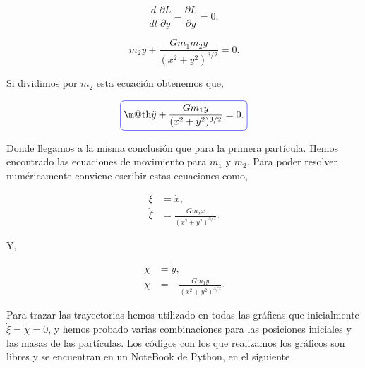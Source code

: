 \documentclass[a4paper,10pt]{article}
\makeatletter
\numberwithin{equation}{section}
\newcommand*{\boxcolor}{blue}
\renewcommand{\boxed}[1]{\textcolor{\boxcolor}{%
\tikz[baseline={([yshift=-1ex]current bounding box.center)}] \node [rectangle, minimum width=1ex,rounded corners,draw] {\normalcolor\m@th$\displaystyle#1$};}}
\makeatother
\begin{document}
\begin{equation}
 \frac{d}{dt} \frac{\partial L}{\partial \dot{y}} - \frac{\partial L}{\partial y} = 0,
\end{equation}

\begin{equation}
 m_2\ddot{y} + \frac{G m_1 m_2 y}{(x^2+y^2)^{3/2}} = 0.
\end{equation}

Si dividimos por $m_2$ esta ecuación obtenemos que,

\begin{equation}
 \boxed{\ddot{y} + \frac{G m_1 y}{(x^2+y^2)^{3/2}} = 0.}
\end{equation}

Donde llegamos a la misma conclusión que para la primera partícula. 
Hemos encontrado las ecuaciones de movimiento para $m_1$ y $m_2$. 
Para poder resolver numéricamente conviene escribir estas ecuaciones como,

\begin{align}
 \xi &= \dot{x}, \\ 
 \dot{\xi} &= \frac{G m_2 x }{(x^2+y^2)^{3/2}}.
\end{align}

Y,

\begin{align}
 \chi &= \dot{y}, \\
 \dot{\chi} &= - \frac{G m_1 y }{(x^2+y^2)^{3/2}}.
\end{align}

Para trazar las trayectorias hemos utilizado en todas las
gráficas que inicialmente $\dot{\xi} = \dot{\chi} = 0$, y hemos probado varias 
combinaciones para las posiciones iniciales y las masas de las partículas. Los códigos 
con los que realizamos los gráficos son libres y se encuentran en un NoteBook de Python,
en el siguiente \href{https://github.com/FavioVazquez/MecanicaClasica-PCF/blob/master/Tarea4/Problema\%201.ipynb}{\color{blue}{.::link::.}}
\end{document}
